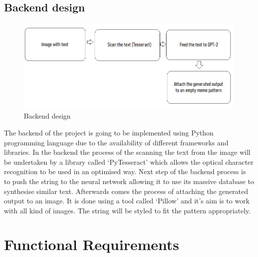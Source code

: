 \documentclass[12pt]{report}
\begin{document}
    \clearpage

    \subsection*{Backend design}
    \paragraph{}

    \begin{figure}[h]
        \centerline{\includegraphics[scale=.5]{img/backend_diagram.png}}
        \label{backend_diagram}
        \caption{Backend design}
    \end{figure}

    The backend of the project is going to be implemented using Python programming language due to the availability of different frameworks and libraries. In the backend the process of the scanning the text from the image will be undertaken by a library called `PyTesseract' which allows the optical character recognition to be used in an optimised way.
    Next step of the backend process is to push the string to the neural network allowing it to use its massive database to synthesise similar text. Afterwards comes the process of attaching the generated output to an image. It is done using a tool called `Pillow' and it's aim is to work with all kind of images. The string will be styled to fit the pattern appropriately.

    \clearpage

    \section*{Functional Requirements}
    \paragraph{}
\end{document}
